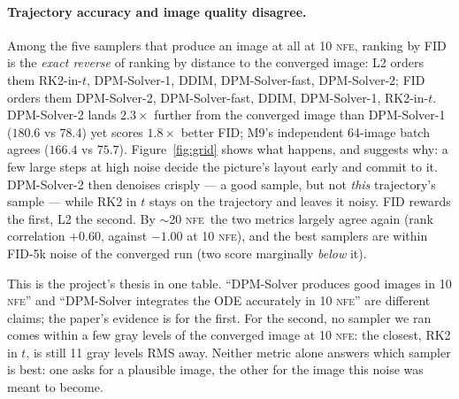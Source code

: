 \documentclass[11pt,a4paper]{article}
\newcommand{\NFE}{\textsc{nfe}}
\begin{document}
\paragraph{Trajectory accuracy and image quality disagree.} Among the five
samplers that produce an image at all at 10 \NFE, ranking by FID is the
\emph{exact reverse} of ranking by distance to the converged image: L2 orders them
RK2-in-$t$, DPM-Solver-1, DDIM, DPM-Solver-fast, DPM-Solver-2; FID orders them
DPM-Solver-2, DPM-Solver-fast, DDIM, DPM-Solver-1, RK2-in-$t$. DPM-Solver-2 lands
$2.3\times$ further from the converged image than DPM-Solver-1 ($180.6$ vs $78.4$)
yet scores $1.8\times$ better FID; M9's independent 64-image batch agrees ($166.4$ vs
$75.7$). Figure~\ref{fig:grid} shows what happens, and suggests why: a few large
steps at high noise decide the picture's layout early and commit to it. DPM-Solver-2 then denoises crisply --- a
good sample, but not \emph{this} trajectory's sample --- while RK2 in $t$ stays on
the trajectory and leaves it noisy. FID rewards the first, L2 the second. By
$\sim$20 \NFE\ the two metrics largely agree again (rank correlation $+0.60$,
against $-1.00$ at 10 \NFE), and the best samplers are within
FID-5k noise of the converged run (two score marginally \emph{below} it).

This is the project's thesis in one table. ``DPM-Solver produces good images in 10
\NFE'' and ``DPM-Solver integrates the ODE accurately in 10 \NFE'' are different
claims; the paper's evidence is for the first. For the second, no sampler we ran
comes within a few gray levels of the converged image at 10 \NFE: the closest,
RK2 in $t$, is still 11 gray levels RMS away. Neither metric alone answers which sampler is best: one
asks for a plausible image, the other for the image this noise was meant to
become.
\end{document}
